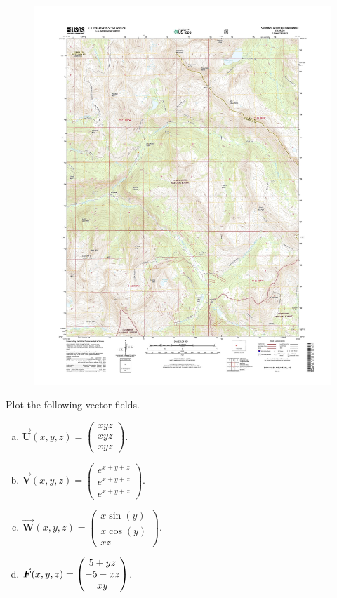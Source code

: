 \documentclass[12pt]{article} %
\newcommand{\vecfieldV}{\boldsymbol{\vec{V}}}
\newcommand{\vecfieldU}{\boldsymbol{\vec{U}}}
\newcommand{\vecfieldW}{\boldsymbol{\vec{W}}}
\begin{document}
\begin{problem}
\begin{figure}[H]
    \includegraphics[width=1.1\textwidth]{figures/snowmass_topo.jpg}
\end{figure}
\end{problem}

\begin{problem}
Plot the following vector fields.
\begin{multicols}{2}
\begin{enumerate}[(a)]
    \item $\vecfieldU(x,y,z) = \begin{pmatrix} xyz \\ xyz \\ xyz \end{pmatrix}$.
    \item $\vecfieldV(x,y,z) = \begin{pmatrix} e^{x+y+z} \\ e^{x+y+z} \\ e^{x+y+z} \end{pmatrix}$.
    \item $\vecfieldW(x,y,z) = \begin{pmatrix} x \sin(y) \\ x \cos(y) \\ xz \end{pmatrix}$.
    \item $\boldsymbol{\vec{F}}(x,y,z) = \begin{pmatrix} 5 + yz \\ -5 -xz \\ xy \end{pmatrix}$.
\end{enumerate}
\end{multicols}
\end{problem}
\end{document}

